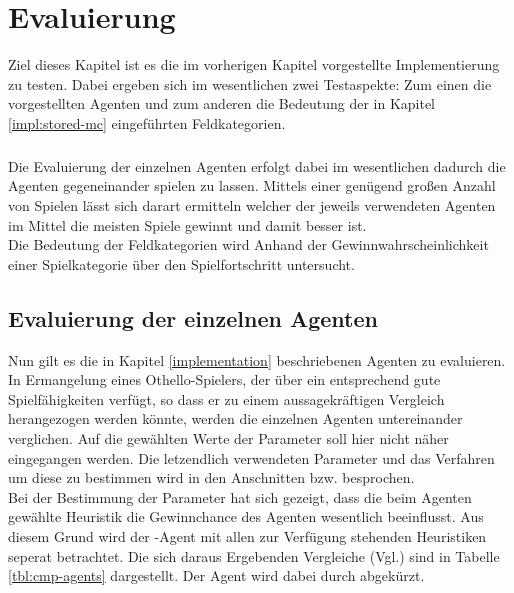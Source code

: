 \chapter{Evaluierung}
Ziel dieses Kapitel ist es die im vorherigen Kapitel vorgestellte Implementierung zu testen. Dabei ergeben sich im wesentlichen zwei Testaspekte: Zum einen die vorgestellten Agenten und zum anderen die Bedeutung der in Kapitel \ref{impl:stored-mc} eingeführten Feldkategorien.
\paragraph{}
Die Evaluierung der einzelnen Agenten erfolgt dabei im wesentlichen dadurch die Agenten gegeneinander spielen zu lassen. Mittels einer genügend großen Anzahl von Spielen lässt sich darart ermitteln welcher der jeweils verwendeten Agenten im Mittel die meisten Spiele gewinnt und damit besser ist.
\\Die Bedeutung der Feldkategorien wird Anhand der Gewinnwahrscheinlichkeit einer Spielkategorie über den Spielfortschritt untersucht.
\section{Evaluierung der einzelnen Agenten}
\label{cpt:eval-agents}
Nun gilt es die in Kapitel \ref{implementation} beschriebenen Agenten zu evaluieren. In Ermangelung eines Othello-Spielers, der über ein entsprechend gute Spielfähigkeiten verfügt, so dass er zu einem aussagekräftigen Vergleich herangezogen werden könnte, werden die einzelnen Agenten untereinander verglichen. Auf die gewählten Werte der Parameter soll hier nicht näher eingegangen werden. Die letzendlich verwendeten Parameter und das Verfahren um diese zu bestimmen wird in den Anschnitten  bzw.  besprochen.
\\Bei der Bestimmung der Parameter hat sich gezeigt, dass die beim Agenten  gewählte Heuristik die Gewinnchance des Agenten wesentlich beeinflusst. Aus diesem Grund wird der -Agent mit allen zur Verfügung stehenden Heuristiken seperat betrachtet. Die sich daraus Ergebenden Vergleiche (Vgl.) sind in Tabelle \ref{tbl:cmp-agents} dargestellt. Der Agent  wird dabei durch  abgekürzt.

